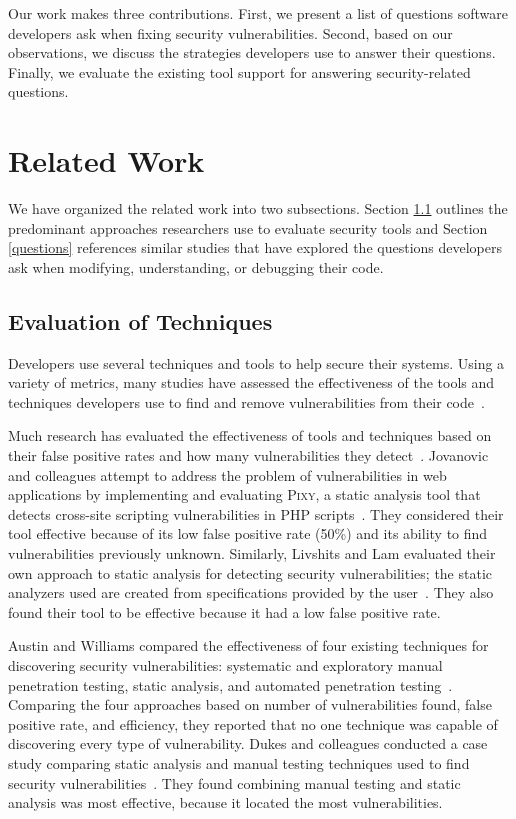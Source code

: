 \documentclass{acm_proc_article-sp}
\begin{document}
Our work makes three contributions. 
First, we present a list of questions software developers ask when fixing security vulnerabilities.
Second, based on our observations, we discuss the strategies developers use to answer their questions.
Finally, we evaluate the existing tool support for answering security-related questions.



\section{Related Work}
\label{sec:rw}

We have organized the related work into two subsections. Section \ref{evaluation} outlines the predominant approaches researchers use to evaluate security tools and Section \ref{questions} references similar studies that have explored the questions developers ask when modifying, understanding, or debugging their code.

\subsection{Evaluation of Techniques}
\label{evaluation}
Developers use several techniques and tools to help secure their systems.
Using a variety of metrics, many studies have assessed the effectiveness of the tools and techniques developers use to find and remove vulnerabilities from their code~\cite{martin2005finding, austin2011one, livshits2005finding}.  

Much research has evaluated the effectiveness of tools and techniques based on their false positive rates and how many vulnerabilities they detect~\cite{jovanovic2006pixy, austin2011one, dukes2013case}. 
Jovanovic and colleagues attempt to address the problem of vulnerabilities in web applications by implementing and evaluating \textsc{Pixy}, a static analysis tool that detects cross-site scripting vulnerabilities in PHP scripts~\cite{jovanovic2006pixy}. 
They considered their tool effective because of its low false positive rate (50\%) and its ability to find vulnerabilities previously unknown. 
Similarly, Livshits and Lam evaluated their own approach to static analysis for detecting security vulnerabilities; the static analyzers used are created from specifications provided by the user~\cite{livshits2005finding}. 
They also found their tool to be effective because it had a low false positive rate. 

Austin and Williams compared the effectiveness of four existing techniques for discovering security vulnerabilities: systematic and exploratory manual  penetration testing, static analysis, and automated penetration testing~\cite{austin2011one}. 
Comparing the four approaches based on number of vulnerabilities found, false positive rate, and efficiency, they reported that no one technique was capable of discovering every type of vulnerability. 
Dukes and colleagues conducted a case study comparing static analysis and manual testing techniques used to find security vulnerabilities~\cite{dukes2013case}. 
They found combining manual testing and static analysis was most effective, because it located the most vulnerabilities.
\end{document}

